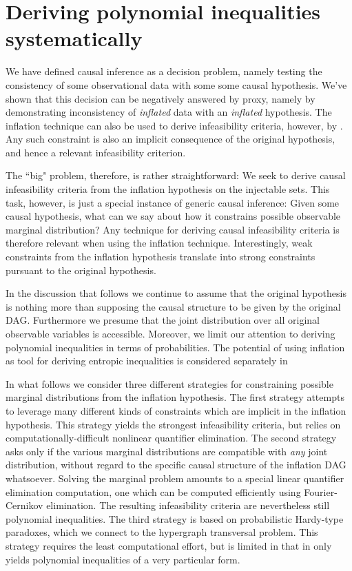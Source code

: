 \section{Deriving polynomial inequalities systematically}
\label{sec:ineqs}

We have defined causal inference as a decision problem, namely testing the consistency of some observational data with some some causal hypothesis. We've shown that this decision can be negatively answered by proxy, namely by demonstrating inconsistency of \emph{inflated} data with an \emph{inflated} hypothesis. The inflation technique can also be used to derive infeasibility criteria, however, by . Any such constraint is also an implicit consequence of the original hypothesis, and hence a relevant infeasibility criterion.

The ``big" problem, therefore, is rather straightforward: We seek to derive causal infeasibility criteria from the inflation hypothesis on the injectable sets. This task, however, is just a special instance of generic causal inference: Given some causal hypothesis, what can we say about how it constrains possible observable marginal distribution? Any technique for deriving causal infeasibility criteria is therefore relevant when using the inflation technique. Interestingly, weak constraints from the inflation hypothesis translate into strong constraints pursuant to the original hypothesis.

In the discussion that follows we continue to assume that the original hypothesis is nothing more than supposing the causal structure to be given by the original DAG. Furthermore we presume that the joint distribution over all original observable variables is accessible. Moreover, we limit our attention to deriving polynomial inequalities in terms of probabilities. The potential of using inflation as tool for deriving entropic inequalities is considered separately in 

In what follows  we consider three different strategies for constraining possible marginal distributions from the inflation hypothesis. The first strategy attempts to leverage many different kinds of constraints which are implicit in the inflation hypothesis. This strategy yields the strongest infeasibility criteria, but relies on computationally-difficult nonlinear quantifier elimination. The second strategy asks only if the various marginal distributions are compatible with \emph{any} joint distribution, without regard to the specific causal structure of the inflation DAG whatsoever. Solving the marginal problem amounts to a special linear quantifier elimination computation, one which can be  computed efficiently using Fourier-Cernikov elimination. The resulting infeasibility criteria are nevertheless still polynomial inequalities. The third strategy is based on probabilistic Hardy-type paradoxes, which we connect to the hypergraph transversal problem. This strategy requires the least computational effort, but is limited in that in only yields polynomial inequalities of a very particular form.

